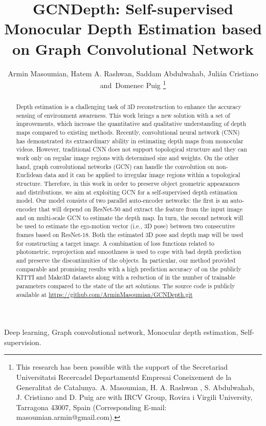 \documentclass[journal]{IEEEtran}
\begin{document}
\title{GCNDepth: Self-supervised Monocular Depth Estimation based on Graph Convolutional Network}
\author{Armin Masoumian,
        Hatem A. Rashwan,
        Saddam Abdulwahab,
        Julián Cristiano
        and~Domenec Puig
\thanks{This research has been possible with the support of the Secretariad Universitatsi Recercadel Departamentd Empresai Coneixement de la Generalitat de Catalunya.
A. Masoumian, H. A. Rashwan , S. Abdulwahab, J. Cristiano and D. Puig are with IRCV Group, Rovira i Virgili University, Tarragona 43007, Spain (Corresponding E-mail: masoumian.armin@gmail.com). 
}}
\maketitle
\begin{abstract}
Depth estimation is a challenging task of 3D reconstruction to enhance the accuracy sensing of environment awareness. This work brings a new solution with a set of improvements, which increase the quantitative and qualitative understanding of depth maps compared to existing methods. Recently, convolutional neural network (CNN) has demonstrated its extraordinary ability in estimating depth maps from monocular videos. However, traditional CNN does not support topological structure and they can work only on regular image regions with determined size and weights. On the other hand, graph convolutional networks (GCN) can handle the convolution on non-Euclidean data and it can be applied to irregular image regions within a topological structure. Therefore, in this work in order to preserve object geometric appearances and distributions, we aim at exploiting GCN for a self-supervised depth estimation model. Our model consists of two parallel auto-encoder networks: the first is an auto-encoder that will depend on ResNet-50 and extract the feature from the input image and on multi-scale GCN to estimate the depth map. In turn, the second network will be used to estimate the ego-motion vector (i.e., 3D pose) between two consecutive frames based on ResNet-18. Both the estimated 3D pose and depth map will be used for constructing a target image. A combination of loss functions related to photometric, reprojection and smoothness is used to cope with bad depth prediction and preserve the discontinuities of the objects. In particular, our method provided comparable and promising results with a high prediction accuracy of  on the publicly KITTI and Make3D datasets along with a reduction of  in the number of trainable parameters compared to the state of the art solutions.
The source code is publicly available at \textcolor{blue}{\url{https://github.com/ArminMasoumian/GCNDepth.git}}
\end{abstract}
\begin{IEEEkeywords}
Deep learning, Graph convolutional network, Monocular depth estimation, Self-supervision.
\end{IEEEkeywords}
\IEEEpeerreviewmaketitle
\end{document}
